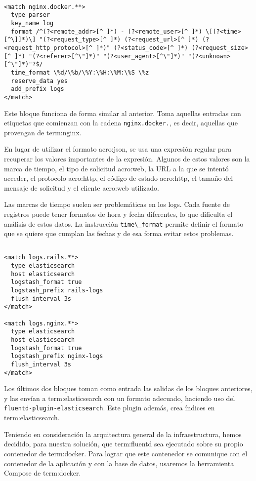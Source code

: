 \begin{lstlisting}

<match nginx.docker.**>
  type parser
  key_name log
  format /^(?<remote_addr>[^ ]*) - (?<remote_user>[^ ]*) \[(?<time>[^\]]*)\] "(?<request_type>[^ ]*) (?<request_url>[^ ]*) (?<request_http_protocol>[^ ]*)" (?<status_code>[^ ]*) (?<request_size>[^ ]*) "(?<referer>[^\"]*)" "(?<user_agent>[^\"]*)" "(?<unknown>[^\"]*)"?$/
  time_format \%d/\%b/\%Y:\%H:\%M:\%S \%z
  reserve_data yes
  add_prefix logs
</match>

\end{lstlisting}

Este bloque funciona de forma similar al anterior. Toma aquellas entradas con
etiquetas que comienzan con la cadena \lstinline{nginx.docker.}, es decir,
aquellas que provengan de \gls{term:nginx}.

En lugar de utilizar el formato \gls{acro:json}, se usa una expresión regular
para recuperar los valores importantes de la expresión. Algunos de estos
valores son la marca de tiempo, el tipo de solicitud \gls{acro:web}, la URL a
la que se intentó acceder, el protocolo \gls{acro:http}, el código de estado
\gls{acro:http}, el tamaño del mensaje de solicitud y el cliente \gls{acro:web}
utilizado.

Las marcas de tiempo suelen ser problemáticas en los logs. Cada fuente de
registros puede tener formatos de hora y fecha diferentes, lo que dificulta el
análisis de estos datos. La instrucción \lstinline{time\_format} permite
definir el formato que se quiere que cumplan las fechas y de esa forma evitar
estos problemas.

\begin{lstlisting}

<match logs.rails.**>
  type elasticsearch
  host elasticsearch
  logstash_format true
  logstash_prefix rails-logs
  flush_interval 3s
</match>

<match logs.nginx.**>
  type elasticsearch
  host elasticsearch
  logstash_format true
  logstash_prefix nginx-logs
  flush_interval 3s
</match>

\end{lstlisting}

Los últimos dos bloques toman como entrada las salidas de los bloques
anteriores, y las envían a \gls{term:elasticsearch} con un formato adecuado,
haciendo uso del  \texttt{fluentd-plugin-elasticsearch}. Este
plugin además, crea índices en \gls{term:elasticsearch}.

Teniendo en consideración la arquitectura general de la infraestructura, hemos
decidido, para nuestra solución, que \gls{term:fluentd} sea ejecutado sobre su
propio contenedor de \gls{term:docker}. Para lograr que este contenedor se
comunique con el contenedor de la aplicación y con la base de datos, usaremos
la herramienta Compose de \gls{term:docker}.


